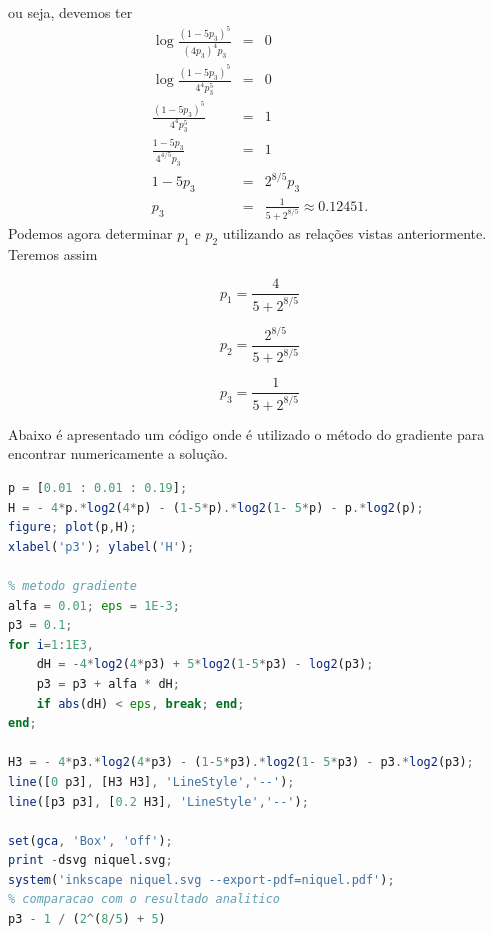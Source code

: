 \begin{questions}
\begin{solution}
  ou seja, devemos ter
  \begin{eqnarray}
  \log \frac{(1-5p_3)^5}{ (4p_3)^4 p_3 } &=& 0 \\
  \log \frac{(1-5p_3)^5}{ 4^4 p_3^5 } &=& 0 \\
  \frac{(1-5p_3)^5}{ 4^4 p_3^5 } &=& 1 \\
  \frac{1-5p_3}{4^{4/5} p_3} &=& 1 \\
  1-5p_3 &=& 2^{8/5} p_3 \\
  p_3 &=& \frac{1}{5 + 2^{8/5}} \approx 0.12451 .
  \end{eqnarray}
  Podemos agora determinar $p_1$ e $p_2$ utilizando as relações vistas anteriormente.
  Teremos assim
  \noindent\begin{minipage}{.33\linewidth}
  \begin{equation}
    p_1 = \frac{4}{5 + 2^{8/5}}
  \end{equation}
  \end{minipage}%
  \begin{minipage}{.33\linewidth}
  \begin{equation}
    p_2 = \frac{2^{8/5}}{5 + 2^{8/5}}
  \end{equation}
  \end{minipage}%
  \begin{minipage}{.33\linewidth}
  \begin{equation}
    p_3 = \frac{1}{5 + 2^{8/5}}
  \end{equation}
  \end{minipage}

  Abaixo é apresentado um código onde é utilizado o método do gradiente 
  para encontrar numericamente a solução.

\begin{lstlisting}[language=Octave]
p = [0.01 : 0.01 : 0.19];
H = - 4*p.*log2(4*p) - (1-5*p).*log2(1- 5*p) - p.*log2(p);
figure; plot(p,H);
xlabel('p3'); ylabel('H');

% metodo gradiente
alfa = 0.01; eps = 1E-3;
p3 = 0.1;
for i=1:1E3, 
    dH = -4*log2(4*p3) + 5*log2(1-5*p3) - log2(p3); 
    p3 = p3 + alfa * dH; 
    if abs(dH) < eps, break; end; 
end;

H3 = - 4*p3.*log2(4*p3) - (1-5*p3).*log2(1- 5*p3) - p3.*log2(p3);
line([0 p3], [H3 H3], 'LineStyle','--');
line([p3 p3], [0.2 H3], 'LineStyle','--');

set(gca, 'Box', 'off');
print -dsvg niquel.svg;
system('inkscape niquel.svg --export-pdf=niquel.pdf');
% comparacao com o resultado analitico
p3 - 1 / (2^(8/5) + 5)
\end{lstlisting}


\end{solution}
\end{questions}
